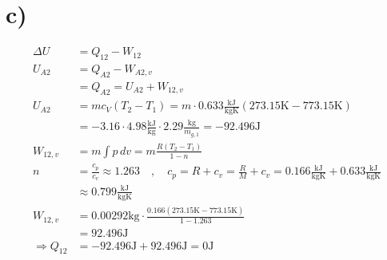 

\section*{c)}

\begin{align*}
\Delta U &= Q_{12} - W_{12} \\
U_{A2} &= Q_{A2} - W_{A2,v} \\
&= Q_{A2} = U_{A2} + W_{12,v} \\
U_{A2} &= mc_V (T_2 - T_1) = m \cdot 0.633 \frac{\text{kJ}}{\text{kgK}} \left( 273.15 \text{K} - 773.15 \text{K} \right) \\
&= -3.16 \cdot 4.98 \frac{\text{kJ}}{\text{kg}} \cdot 2.29 \frac{\text{kg}}{m_{g,1}} = -92.496 \text{J} \\
W_{12,v} &= m \int p \, dv = m \frac{R (T_2 - T_1)}{1 - n} \\
n &= \frac{c_p}{c_v} \approx 1.263 \quad , \quad c_p = R + c_v = \frac{R}{M} + c_v = 0.166 \frac{\text{kJ}}{\text{kgK}} + 0.633 \frac{\text{kJ}}{\text{kgK}} \\
&\approx 0.799 \frac{\text{kJ}}{\text{kgK}} \\
W_{12,v} &= 0.00292 \text{kg} \cdot \frac{0.166 (273.15 \text{K} - 773.15 \text{K})}{1 - 1.263} \\
&= 92.496 \text{J} \\
\Rightarrow Q_{12} &= -92.496 \text{J} + 92.496 \text{J} = 0 \text{J}
\end{align*}